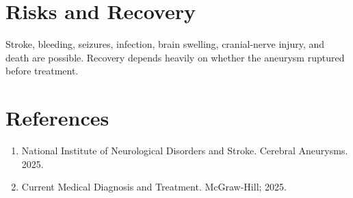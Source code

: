 \section*{Risks and Recovery}
Stroke, bleeding, seizures, infection, brain swelling, cranial-nerve injury, and death are possible. Recovery depends heavily on whether the aneurysm ruptured before treatment.
\section*{References}
\begin{enumerate}\item National Institute of Neurological Disorders and Stroke. Cerebral Aneurysms. 2025.\item Current Medical Diagnosis and Treatment. McGraw-Hill; 2025.\end{enumerate}
\clearpage
